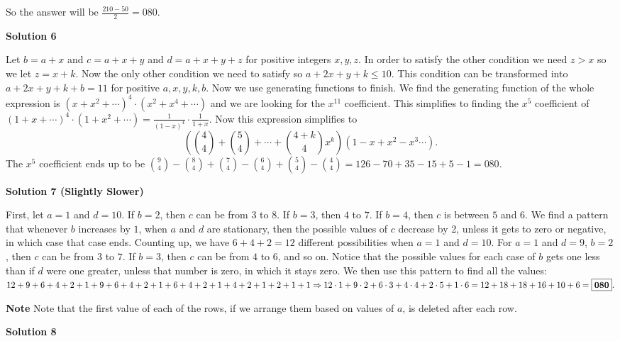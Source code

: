 \begin{enumerate}
 So the answer will be $\frac{210-50}{2} = \boxed{080}.$




\textbf{Solution 6}

Let $b = a+x$ and $c = a+x+y$ and $d = a+x+y+z$ for positive integers $x,y,z.$ In order to satisfy the other condition we need $z > x$ so we let $z = x+k.$ Now the only other condition we need to satisfy so $a+2x+y+k \le 10.$ This condition can be transformed into $a+2x+y+k+b  = 11$ for positive $a,x,y,k,b.$ Now we use generating functions to finish. We find the generating function of the whole expression is $(x + x^2 + \cdots)^4 \cdot (x^2+x^4 + \cdots)$ and we are looking for the $x^{11}$ coefficient. This simplifies to finding the $x^5$ coefficient of $(1+x+\cdots)^4 \cdot (1+x^2+\cdots) =\frac{1}{(1-x)^4} \cdot\frac{1}{1+x}.$ Now this expression simplifies to 
 \[\left(\binom{4}{4}+\binom{5}{4} + \cdots +\binom{4+k}{4}x^k\right)(1-x+x^2-x^3 \cdots).\] The $x^5$ coefficient ends up to be $\binom{9}{4} -\binom{8}{4} +\binom{7}{4} -\binom{6}{4} +\binom{5}{4} -\binom{4}{4} = 126 - 70 + 35 - 15 + 5 - 1 = \boxed{080}.$




\textbf{Solution 7 (Slightly Slower)}

First, let $a=1$ and $d=10$. If $b=2$, then $c$ can be from $3$ to $8$. If $b=3$, then $4$ to $7$. If $b=4$, then $c$ is between $5$ and $6$. We find a pattern that whenever $b$ increases by $1$, when $a$ and $d$ are stationary, then the possible values of $c$ decrease by 2, unless it gets to zero or negative, in which case that case ends. Counting up, we have $6+4+2=12$ different possibilities when $a=1$ and $d=10$. For $a=1$ and $d=9$, $b=2$, then $c$ can be from $3$ to $7$. If $b=3$, then $c$ can be from $4$ to $6$, and so on. Notice that the possible values for each case of $b$ gets one less than if $d$ were one greater, unless that number is zero, in which it stays zero. We then use this pattern to find all the values: $12+9+6+4+2+1+9+6+4+2+1+6+4+2+1+4+2+1+2+1+1 \Rightarrow  \\ 12\cdot1+9\cdot2+6\cdot3+4\cdot4+2\cdot5+1\cdot6= \\ 12+18+18+16+10+6=\boxed{\textbf{080}}.$

 \textbf{Note} Note that the first value of each of the rows, if we arrange them based on values of $a$, is deleted after each row.

 



\textbf{Solution 8}


\end{enumerate}
